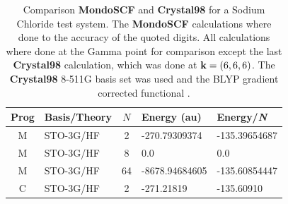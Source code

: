 \documentclass[prb,aps,nobibnotes,twocolumn,doublespace,twocolumngrid,superbib]{revtex4}
\begin{document}
 



\eject

\begin{table}
\caption{Comparison \textbf{MondoSCF} and \textbf{Crystal98} for a 
Sodium Chloride test system. The \textbf{MondoSCF} calculations where done to
the accuracy of the quoted digits. All calculations where done at the Gamma point
for comparison except the last \textbf{Crystal98} calculation, which was done at ${\bf k}=(6,6,6)$.
The \textbf{Crystal98} 8-511G  basis set was used \cite{C98Basis} and the BLYP gradient corrected 
functional \cite{Becke93}.}
\label{table:ComToCrystal98_1}
 
\begin{tabular}{clcll}
\hline 
Prog&
Basis/Theory&
\( N \)&
Energy  (au)&
Energy/{\it N}\\
\hline
\hline 
M &
STO-3G/HF &
2 &
-270.79309374 &
-135.39654687 \\
M&
STO-3G/HF&
8&
0.0 &
0.0 \\
M&
STO-3G/HF&
64&
-8678.94684605 &
 -135.60854447 \\
\hline
C&
STO-3G/HF&
2&
-271.21819 &
-135.60910 \\
\hline 
\hline
\end{tabular}
\end{table}
\end{document}
